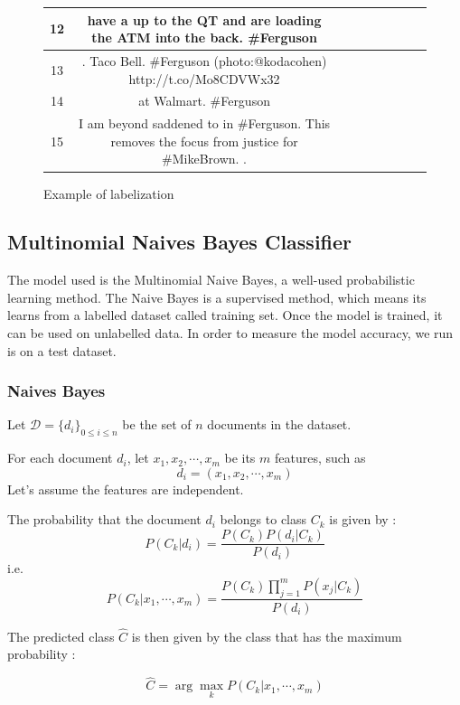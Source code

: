 \documentclass[a4paper,12pt]{report}
\newcommand{\nl}{\tabularnewline\midrule}
\begin{document}
\begin{figure}[h!]
\begin{tabular}{c|Cp{3cm}}
12 &  have  a  up to the QT and are loading the ATM into the back. \#Ferguson &  \newline {} \nl
13 & . Taco Bell. \#Ferguson (photo:@kodacohen) http://t.co/Mo8CDVWx32 &  \newline {} \nl
14 &   at Walmart. \#Ferguson &  \newline {} \nl
15 & I am beyond saddened to  in \#Ferguson. This removes the focus from justice for \#MikeBrown. . &  \newline {} \nl
\end{tabular}
\label{tabtypes}
\caption{Example of labelization}
\end{figure}

\subsection{Multinomial Naives Bayes Classifier}

The model used is the Multinomial Naive Bayes, a well-used probabilistic learning method.
The Naive Bayes is a supervised method, which means its learns from a labelled dataset called training set. Once the model is trained, it can be used on unlabelled data. In order to measure the model accuracy, we run is on a test dataset.

\subsubsection{Naives Bayes}
Let $ \mathcal{D} = \{ d_i \}_{0\leq i\leq n} $ be the set of $n$ documents in the dataset.

For each document $d_i$, let $x_{1},x_{2},\cdots,x_{m}$ be its $m$ features, such as $$d_i = (x_{1},x_{2},\cdots,x_{m})$$
Let's assume the features are independent.

The probability that the document $d_i$ belongs to class $C_k$ is given by :
$$ P(C_k|d_i) = \frac{P(C_k)P(d_i|C_k)}{P(d_i)} $$
i.e. $$ P(C_k|x_{1},\cdots,x_{m}) = \frac{P(C_k)\prod_{j=1}^mP(x_{j}|C_k)}{P(d_i)} $$

The predicted class $\hat{C}$ is then given by the class that has the maximum probability :

$$ \hat{C} = \arg \max_k P(C_k|x_{1},\cdots,x_{m}) $$
\end{document}
